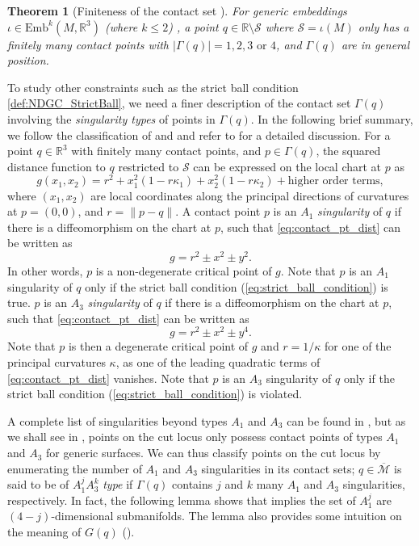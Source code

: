 \documentclass[11pt]{article}
\newcommand{\R}{\mathbb{R}}
\newcommand{\Emb}{\mathrm{Emb}^k(M,\R^3)}
\newcommand{\med}{\mathcal{M}}
\newcommand{\Surf}{\mathcal{S}}
\theoremstyle{plain}
\newtheorem{thm}{Theorem}
\theoremstyle{definition}
\theoremstyle{remark}
\begin{document}
	\begin{thm}[Finiteness of the contact set \citep{yomdin_local_1981}]
		\label{thm:finite_contact}
		For generic embeddings $\iota \in \Emb$ (where $k \leq 2$) , a point $q \in \R \setminus \Surf$ where $\Surf = \iota(M)$ only has a finitely many contact points with $|\Gamma(q)| = 1, 2, 3 \text{ or } 4$, and $\Gamma(q)$ are in general position.
	\end{thm}
	
	To study other constraints such as the strict ball condition \ref{def:NDGC_StrictBall}, we need a finer description of the contact set $\Gamma(q)$ involving the \emph{singularity types} of points in $\Gamma(q)$. In the following brief summary, we follow the classification of \cite{mather_distance_1983} and \cite{bruce1992curves} and refer to \cite{cazals_differential_2005} for a detailed discussion. For a point $q \in \R^3$ with finitely many contact points, and $p \in \Gamma(q)$, the squared distance function to $q$ restricted to $\Surf$ can be expressed on the local chart at $p$ as 
	\begin{equation} \label{eq:contact_pt_dist}
		g(x_1,x_2) = r^2 + x_1^2(1-r\kappa_1) + x_2^2(1-r\kappa_2) + \text{higher order terms},
	\end{equation}
	where $(x_1,x_2)$ are local coordinates along the principal directions of curvatures at $p = (0,0)$, and $r = \| p-q\|$. A contact point $p$ is an $A_1$ \emph{singularity} of $q$ if there is a diffeomorphism on the chart at $p$, such that \cref{eq:contact_pt_dist} can be written as 
	\[g = r^2 \pm x^2 \pm y^2.\]
	In other words, $p$ is a non-degenerate critical point of $g$. Note that $p$ is an $A_1$ singularity of $q$ only if the strict ball condition (\cref{eq:strict_ball_condition}) is true. $p$ is an $A_3$ \emph{singularity} of $q$ if there is a diffeomorphism on the chart at $p$, such that \cref{eq:contact_pt_dist} can be written as 
	\[g = r^2 \pm x^2 \pm y^4.\]
	Note that $p$ is then a degenerate critical point of $g$ and $r = 1/\kappa$ for one of the principal curvatures $\kappa$, as one of the leading quadratic terms of \cref{eq:contact_pt_dist} vanishes. Note that $p$ is an $A_3$ singularity of $q$ only if the strict ball condition (\cref{eq:strict_ball_condition}) is violated. 
	
	A complete list of singularities beyond types $A_1$ and $A_3$ can be found in \cite{arnol1974normal}, but as we shall see in , points on the cut locus only possess contact points of types $A_1$ and $A_3$ for generic surfaces. We can thus classify points on the cut locus by enumerating the number of $A_1$ and $A_3$ singularities in its contact sets; $q \in \overline{\med}$ is said to be of $A_1^j A_3^k$ \emph{type} if $\Gamma(q)$ contains $j$ and $k$ many $A_1$ and $A_3$ singularities, respectively. In fact, the following lemma shows that  implies the set of $A_1^j$ are $(4-j)$-dimensional submanifolds. The lemma also provides some intuition on the meaning of $G(q)$ ().
	
\end{document}
